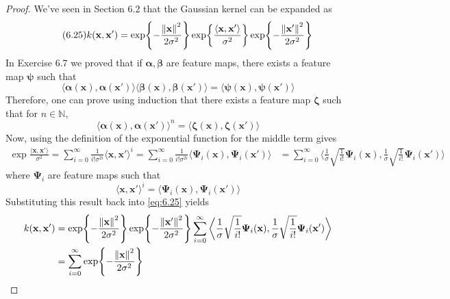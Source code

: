\begin{proof}
    We've seen in Section 6.2 that the Gaussian kernel can be expanded
    as
    \begin{equation}\label{eq:6.25}\tag{6.25}
        k(\mathbf{x}, \mathbf{x}') 
        = \exp{-\frac{\norm{\mathbf{x}}^2}{2\sigma^2}}
        \exp{\frac{\langle \mathbf{x}, \mathbf{x}' \rangle}{\sigma^2}}
        \exp{-\frac{\norm{\mathbf{x}'}^2}{2\sigma^2}}
    \end{equation}
    In Exercise 6.7 we proved that if $\bm{\alpha}, \bm{\beta}$ are feature maps,
    there exists a feature map $\bm{\psi}$ such that
    \[
        \langle \bm{\alpha}(\mathbf{x}), \bm{\alpha}(\mathbf{x}') \rangle
        \langle \bm{\beta}(\mathbf{x}), \bm{\beta}(\mathbf{x}') \rangle
        = \langle \bm{\bm{\psi}}(\mathbf{x}), \bm{\psi}(\mathbf{x}') \rangle
    \] 
    Therefore, one can prove using induction that there exists a feature map $\bm{\zeta}$
    such that for $n \in \mathbb{N}$,
    \[
        \langle \bm{\alpha}(\mathbf{x}), \bm{\alpha}(\mathbf{x}')\rangle^n
        = \langle \bm{\zeta}(\mathbf{x}), \bm{\zeta}(\mathbf{x}') \rangle
    \] 
    Now, using the definition of the exponential function for the middle term gives
    \begin{align*}
        \exp{\frac{\langle \mathbf{x}, \mathbf{x}' \rangle}{\sigma^2}}
        = \sum_{i=0}^{\infty} \frac{1}{i! \sigma^{2i}} \langle \mathbf{x}, \mathbf{x}' \rangle^i
        = \sum_{i=0}^{\infty} \frac{1}{i! \sigma^{2i}}
        \langle \bm{\Psi}_i(\mathbf{x}), \bm{\Psi}_i(\mathbf{x}') \rangle
        &= \sum_{i=0}^{\infty} 
        \bigg\langle \frac{1}{\sigma}\sqrt{\frac{1}{i!}} \bm{\Psi}_i(\mathbf{x}),
        \frac{1}{\sigma}\sqrt{\frac{1}{i!}} \bm{\Psi}_i(\mathbf{x}') \bigg\rangle
    \end{align*}
    where $\bm{\Psi}_i$ are feature maps such that
    \[
        \langle\mathbf{x}, \mathbf{x}'\rangle^i 
        = \langle \bm{\Psi}_i(\mathbf{x}), \bm{\Psi}_i(\mathbf{x}')\rangle 
    \] 
    Substituting this result back into \eqref{eq:6.25} yields
    \begin{align*}
        k(\mathbf{x}, \mathbf{x}')
        &= \exp{-\frac{\norm{\mathbf{x}}^2}{2\sigma^2}}
        \exp{-\frac{\norm{\mathbf{x}'}^2}{2\sigma^2}}
        \sum_{i=0}^{\infty} \bigg\langle \frac{1}{\sigma}\sqrt{\frac{1}{i!}} \bm{\Psi}_i(\mathbf{x}),
        \frac{1}{\sigma}\sqrt{\frac{1}{i!}} \bm{\Psi}_i(\mathbf{x}') \bigg\rangle \\
        &= \sum_{i=0}^{\infty} 
        \exp{-\frac{\norm{\mathbf{x}}^2}{2\sigma^2}}

\end{align*}
\end{proof}
